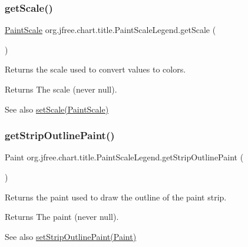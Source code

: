 \subsubsection{\texorpdfstring{get\+Scale()}{getScale()}}
{\footnotesize\ttfamily \mbox{\hyperlink{interfaceorg_1_1jfree_1_1chart_1_1renderer_1_1_paint_scale}{Paint\+Scale}} org.\+jfree.\+chart.\+title.\+Paint\+Scale\+Legend.\+get\+Scale (\begin{DoxyParamCaption}{ }\end{DoxyParamCaption})}

Returns the scale used to convert values to colors.

\begin{DoxyReturn}{Returns}
The scale (never {\ttfamily null}).
\end{DoxyReturn}
\begin{DoxySeeAlso}{See also}
\mbox{\hyperlink{classorg_1_1jfree_1_1chart_1_1title_1_1_paint_scale_legend_a35c03ac444a944d89f057e12420b8525}{set\+Scale(\+Paint\+Scale)}} 
\end{DoxySeeAlso}
\mbox{\label{classorg_1_1jfree_1_1chart_1_1title_1_1_paint_scale_legend_a36458115671fefe01a989b77fad034d8}} 
\subsubsection{\texorpdfstring{get\+Strip\+Outline\+Paint()}{getStripOutlinePaint()}}
{\footnotesize\ttfamily Paint org.\+jfree.\+chart.\+title.\+Paint\+Scale\+Legend.\+get\+Strip\+Outline\+Paint (\begin{DoxyParamCaption}{ }\end{DoxyParamCaption})}

Returns the paint used to draw the outline of the paint strip.

\begin{DoxyReturn}{Returns}
The paint (never {\ttfamily null}).
\end{DoxyReturn}
\begin{DoxySeeAlso}{See also}
\mbox{\hyperlink{classorg_1_1jfree_1_1chart_1_1title_1_1_paint_scale_legend_a1362e27da5a7d168bb17453aa41dd14f}{set\+Strip\+Outline\+Paint(\+Paint)}} 
\end{DoxySeeAlso}
\mbox{\label{classorg_1_1jfree_1_1chart_1_1title_1_1_paint_scale_legend_af735d5472f8cf21e1e07b7a1d5a5fe53}} 
